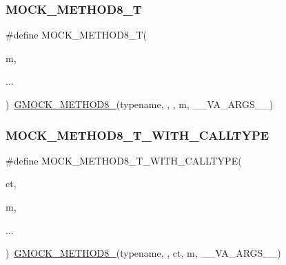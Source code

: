 \mbox{\label{googletest-master_2googlemock_2include_2gmock_2gmock-generated-function-mockers_8h_aa7e6573bb6a57f2a2d3c2875caeffaa3}} 
\subsubsection{\texorpdfstring{MOCK\_METHOD8\_T}{MOCK\_METHOD8\_T}}
{\footnotesize\ttfamily \#define M\+O\+C\+K\+\_\+\+M\+E\+T\+H\+O\+D8\+\_\+T(\begin{DoxyParamCaption}\item[{}]{m,  }\item[{}]{... }\end{DoxyParamCaption})~\mbox{\hyperlink{_obj__test_2lib_2googletest-release-1_88_81_2googlemock_2include_2gmock_2gmock-generated-function-mockers_8h_aa84a36427c44505207b7cad5dec7ad67}{G\+M\+O\+C\+K\+\_\+\+M\+E\+T\+H\+O\+D8\+\_\+}}(typename, , , m, \+\_\+\+\_\+\+V\+A\+\_\+\+A\+R\+G\+S\+\_\+\+\_\+)}

\mbox{\label{googletest-master_2googlemock_2include_2gmock_2gmock-generated-function-mockers_8h_a0cf1d3aba371dfe424d27b97b5473174}} 
\subsubsection{\texorpdfstring{MOCK\_METHOD8\_T\_WITH\_CALLTYPE}{MOCK\_METHOD8\_T\_WITH\_CALLTYPE}}
{\footnotesize\ttfamily \#define M\+O\+C\+K\+\_\+\+M\+E\+T\+H\+O\+D8\+\_\+\+T\+\_\+\+W\+I\+T\+H\+\_\+\+C\+A\+L\+L\+T\+Y\+PE(\begin{DoxyParamCaption}\item[{}]{ct,  }\item[{}]{m,  }\item[{}]{... }\end{DoxyParamCaption})~\mbox{\hyperlink{_obj__test_2lib_2googletest-release-1_88_81_2googlemock_2include_2gmock_2gmock-generated-function-mockers_8h_aa84a36427c44505207b7cad5dec7ad67}{G\+M\+O\+C\+K\+\_\+\+M\+E\+T\+H\+O\+D8\+\_\+}}(typename, , ct, m, \+\_\+\+\_\+\+V\+A\+\_\+\+A\+R\+G\+S\+\_\+\+\_\+)}

